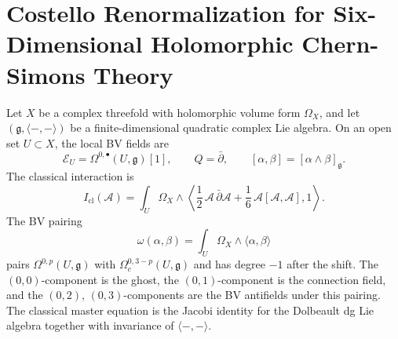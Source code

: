\providecommand{\hCS}{\mathrm{hCS}}
\providecommand{\Obs}{\mathrm{Obs}}
\providecommand{\CE}{\mathrm{CE}}
\providecommand{\Loc}{\mathrm{Loc}}
\providecommand{\Fields}{\mathrm{Fields}}
\providecommand{\Aut}{\mathrm{Aut}}
\providecommand{\Sym}{\mathrm{Sym}}
\providecommand{\End}{\mathrm{End}}
\providecommand{\Tr}{\operatorname{Tr}}
\providecommand{\Rep}{\mathrm{Rep}}
\providecommand{\CoHA}{\mathrm{CoHA}}
\providecommand{\Yp}{Y^{+}}
\providecommand{\Woneinf}{\mathcal{W}_{1+\infty}}
\providecommand{\Eone}{E_1}
\providecommand{\Etwo}{E_2}
\providecommand{\Ethree}{E_3}
\providecommand{\cA}{\mathcal{A}}
\providecommand{\cE}{\mathcal{E}}
\providecommand{\cO}{\mathcal{O}}
\providecommand{\cZ}{\mathcal{Z}}
\providecommand{\fg}{\mathfrak{g}}
\providecommand{\dbar}{\bar{\partial}}
\providecommand{\dbarstar}{\bar{\partial}^{\ast}}
\providecommand{\bracket}[2]{\{#1,#2\}}
\providecommand{\kanom}{\kappa_{\mathrm{anom}}}
\providecommand{\kch}{\kappa_{\mathrm{ch}}}
\providecommand{\kcat}{\kappa_{\mathrm{cat}}}
\providecommand{\kBKM}{\kappa_{\mathrm{BKM}}}
\providecommand{\kfib}{\kappa_{\mathrm{fiber}}}

\section{Costello Renormalization for Six-Dimensional Holomorphic Chern-Simons Theory}
\label{sec:costello-renormalization-6d-hcs}

Let \(X\) be a complex threefold with holomorphic volume form
\(\Omega_X\), and let
\((\fg,\langle-,-\rangle)\) be a finite-dimensional quadratic complex
Lie algebra.  On an open set \(U\subset X\), the local BV fields are
\[
  \cE_U=\Omega^{0,\bullet}(U,\fg)[1],
  \qquad
  Q=\dbar ,
  \qquad
  [\alpha,\beta]=[\alpha\wedge\beta]_{\fg}.
\]
The classical interaction is
\[
  I_{\mathrm{cl}}(\cA)
  =
  \int_U\Omega_X\wedge
  \left\langle
    \frac12\,\cA\,\dbar\cA+
    \frac16\,\cA[\cA,\cA],
    1
  \right\rangle .
\]
The BV pairing
\[
  \omega(\alpha,\beta)
  =
  \int_U\Omega_X\wedge\langle\alpha,\beta\rangle
\]
pairs \(\Omega^{0,p}(U,\fg)\) with
\(\Omega^{0,3-p}_c(U,\fg)\) and has degree \(-1\) after the shift.
The \((0,0)\)-component is the ghost, the \((0,1)\)-component is the
connection field, and the \((0,2)\), \((0,3)\)-components are the BV
antifields under this pairing.  The classical master equation is the
Jacobi identity for the Dolbeault dg Lie algebra together with
invariance of \(\langle-,-\rangle\).

